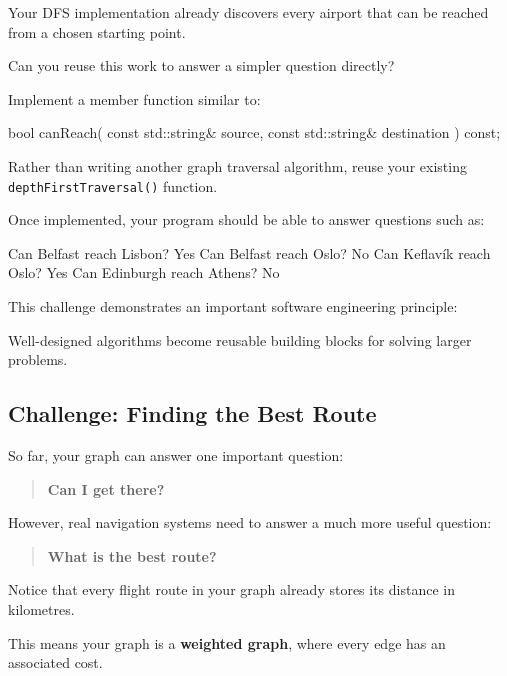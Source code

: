 \documentclass{csc2059practical}
\begin{document}
Your DFS implementation already discovers every airport that can be reached from a chosen starting point.

Can you reuse this work to answer a simpler question directly?

Implement a member function similar to:

\begin{cppcode}
bool canReach(
    const std::string& source,
    const std::string& destination
) const;
\end{cppcode}

Rather than writing another graph traversal algorithm, reuse your existing \texttt{depthFirstTraversal()} function.

Once implemented, your program should be able to answer questions such as:

\begin{terminal}
Can Belfast reach Lisbon?        Yes
Can Belfast reach Oslo?          No
Can Keflavík reach Oslo?         Yes
Can Edinburgh reach Athens?      No
\end{terminal}

\begin{tipbox}
This challenge demonstrates an important software engineering principle:

Well-designed algorithms become reusable building blocks for solving larger problems.
\end{tipbox}

\subsection{Challenge: Finding the Best Route}

So far, your graph can answer one important question:

\begin{quote}
\textbf{Can I get there?}
\end{quote}

However, real navigation systems need to answer a much more useful question:

\begin{quote}
\textbf{What is the best route?}
\end{quote}

Notice that every flight route in your graph already stores its distance in kilometres.

This means your graph is a \textbf{weighted graph}, where every edge has an associated cost.
\end{document}
